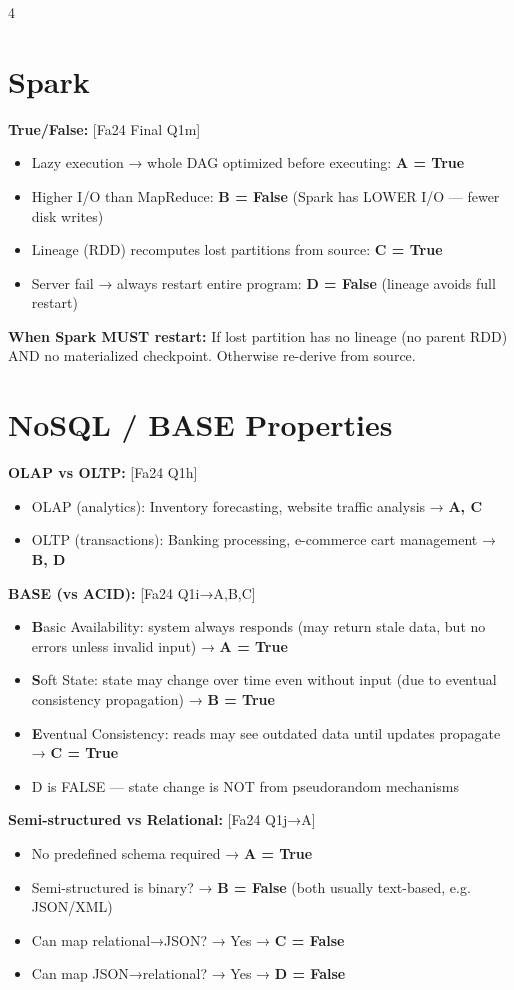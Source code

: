 \documentclass[8pt,letterpaper]{article}
\newcommand{\key}[1]{\textbf{\color{red!70!black}#1}}
\newcommand{\ans}[1]{\textbf{\color{blue!80!black}#1}}
\newcommand{\qref}[1]{{\fontsize{3.5}{4}\selectfont\color{purple!60!black}[#1]}}
\begin{document}
\begin{multicols*}{4}
\section{Spark}
\key{True/False:} \qref{Fa24 Final Q1m}
\begin{itemize}
  \item Lazy execution → whole DAG optimized before executing: \ans{A = True}
  \item Higher I/O than MapReduce: \ans{B = False} (Spark has LOWER I/O — fewer disk writes)
  \item Lineage (RDD) recomputes lost partitions from source: \ans{C = True}
  \item Server fail → always restart entire program: \ans{D = False} (lineage avoids full restart)
\end{itemize}

\key{When Spark MUST restart:} If lost partition has no lineage (no parent RDD) AND no materialized checkpoint. Otherwise re-derive from source.

\section{NoSQL / BASE Properties}
\key{OLAP vs OLTP:} \qref{Fa24 Q1h}
\begin{itemize}
  \item OLAP (analytics): Inventory forecasting, website traffic analysis → \ans{A, C}
  \item OLTP (transactions): Banking processing, e-commerce cart management → \ans{B, D}
\end{itemize}

\key{BASE (vs ACID):} \qref{Fa24 Q1i→A,B,C}
\begin{itemize}
  \item \textbf{B}asic Availability: system always responds (may return stale data, but no errors unless invalid input) → \ans{A = True}
  \item \textbf{S}oft State: state may change over time even without input (due to eventual consistency propagation) → \ans{B = True}
  \item \textbf{E}ventual Consistency: reads may see outdated data until updates propagate → \ans{C = True}
  \item D is FALSE — state change is NOT from pseudorandom mechanisms
\end{itemize}

\key{Semi-structured vs Relational:} \qref{Fa24 Q1j→A}
\begin{itemize}
  \item No predefined schema required → \ans{A = True}
  \item Semi-structured is binary? → \ans{B = False} (both usually text-based, e.g. JSON/XML)
  \item Can map relational→JSON? → Yes → \ans{C = False}
  \item Can map JSON→relational? → Yes → \ans{D = False}
\end{itemize}


\end{multicols*}
\end{document}
